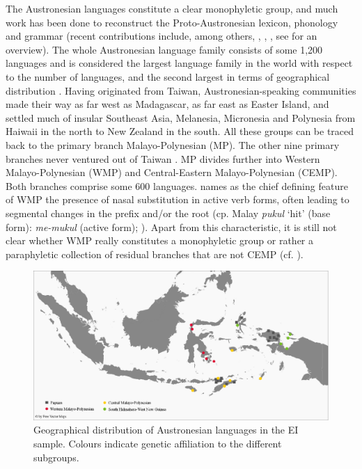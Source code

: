 The Austronesian languages constitute a clear monophyletic group, and much work has been done to reconstruct the Proto-Austronesian lexicon, phonology and grammar (recent contributions include, among others, \citealt{Tryon1995}, \citealt{wouk2002history}, \citealt{blust2009austronesian}, see \citealt{adelaar2005austronesian} for an overview). The whole Austronesian language family consists of some 1,200 languages and is considered the largest language family in the world with respect to the number of languages, and the second largest in terms of geographical distribution \citep{adelaar2005austronesian}. Having originated from Taiwan, Austronesian-speaking communities made their way as far west as Madagascar, as far east as Easter Island, and settled much of insular Southeast Asia, Melanesia, Micronesia and Polynesia from Haiwaii in the north to New Zealand in the south. All these groups can be traced back to the primary branch Malayo-Polynesian (MP). The other nine primary branches never ventured out of Taiwan \citep{blust2009austronesian}. MP divides further into Western Malayo-Polynesian (WMP) and Central-Eastern Malayo-Polynesian (CEMP). Both branches comprise some 600 languages. \citet{blust2009austronesian} names as the chief defining feature of WMP the presence of nasal substitution in active verb forms, often leading to segmental changes in the prefix and/or the root (cp. Malay \textit{pukul} `hit' (base form): \textit{me-mukul} (active form); \citealt[30]{blust2009austronesian}). Apart from this characteristic, it is still not clear whether WMP really constitutes a monophyletic group or rather a paraphyletic collection of residual branches that are not CEMP (cf. \citealt[30]{blust2009austronesian}). 

\begin{figure}
\includegraphics[width=\columnwidth]{figures/Map_overview_klein_Austroaff.eps}
\caption[Geographical distribution of Austronesian languages in the sample]{Geographical distribution of Austronesian languages in the EI sample. Colours indicate genetic affiliation to the different subgroups.}\label{map:Austro}
\end{figure}

